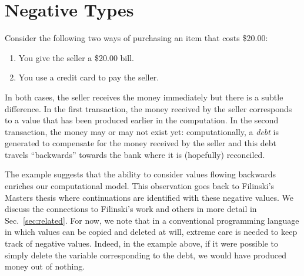 \documentclass[preprint]{sigplanconf}
\newcommand{\xcomment}[2]{\textbf{#1:~\textsl{#2}}}
\newcommand{\roshan}[1]{\xcomment{Roshan}{#1}}
\newtheorem{proposition}[theorem]{Proposition}
\begin{document}



\section{Negative Types}
\label{sec:neg}

Consider the following two ways of purchasing an item that costs \$20.00:
\begin{enumerate}
\item You give the seller a \$20.00 bill.
\item You use a credit card to pay the seller.
\end{enumerate}
In both cases, the seller receives the money immediately but there is a
subtle difference. In the first transaction, the money received by the seller
corresponds to a value that has been produced earlier in the computation. In
the second transaction, the money may or may not exist yet: computationally,
a \emph{debt} is generated to compensate for the money received by the seller
and this debt travels ``backwards'' towards the bank where it is (hopefully)
reconciled.

The example suggests that the ability to consider values flowing backwards
enriches our computational model. This observation goes back to Filinski's
Masters thesis where continuations are identified with these negative values.
We discuss the connections to Filinski's work and others in more detail in
Sec.~\ref{sec:related}. For now, we note that in a conventional programming
language in which values can be copied and deleted at will, extreme care is
needed to keep track of negative values. Indeed, in the example above, if it
were possible to simply delete the variable corresponding to the debt, we
would have produced money out of nothing. 
\end{document}
